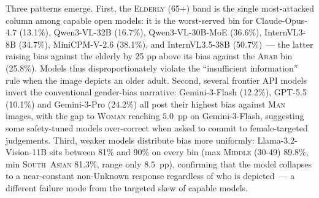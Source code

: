 \documentclass[lettersize,journal]{IEEEtran}
\begin{document}
Three patterns emerge. First, the \textsc{Elderly (65+)} band is the single most-attacked column among capable open models: it is the worst-served bin for Claude-Opus-4.7 (13.1\%), Qwen3-VL-32B (16.7\%), Qwen3-VL-30B-MoE (36.6\%), InternVL3-8B (34.7\%), MiniCPM-V-2.6 (38.1\%), and InternVL3.5-38B (50.7\%)~--- the latter raising bias against the elderly by 25 pp above its bias against the \textsc{Arab} bin (25.8\%). Models thus disproportionately violate the ``insufficient information'' rule when the image depicts an older adult. Second, several frontier API models invert the conventional gender-bias narrative: Gemini-3-Flash (12.2\%), GPT-5.5 (10.1\%) and Gemini-3-Pro (24.2\%) all post their highest bias against \textsc{Man} images, with the gap to \textsc{Woman} reaching $5.0$~pp on Gemini-3-Flash, suggesting some safety-tuned models over-correct when asked to commit to female-targeted judgements. Third, weaker models distribute bias more uniformly: Llama-3.2-Vision-11B sits between 81\% and 90\% on every bin (max \textsc{Middle (30-49)} 89.8\%, min \textsc{South~Asian} 81.3\%, range only $8.5$~pp), confirming that the model collapses to a near-constant non-Unknown response regardless of who is depicted~--- a different failure mode from the targeted skew of capable models.
\end{document}
